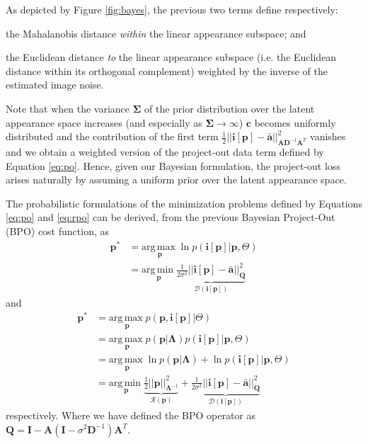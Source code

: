 As depicted by Figure \ref{fig:bayes}, the previous two terms define respectively: 
\begin{inparaenum}
    \item the Mahalanobis distance \emph{within} the linear appearance subspace; and 
    \item the Euclidean distance \emph{to} the linear appearance subspace (i.e. the Euclidean distance within its orthogonal complement) weighted by the inverse of the estimated image noise.
\end{inparaenum}
Note that when the variance $\mathbf{\Sigma}$ of the prior distribution over the latent appearance space increases (and especially as $\mathbf{\Sigma} \rightarrow \infty$) $\mathbf{c}$ becomes uniformly distributed and the contribution of the first term $\frac{1}{2}|| \mathbf{i}[\mathbf{p}] - \mathbf{\bar{a}} ||^2_{\mathbf{A}\mathbf{D}^{-1}\mathbf{A}^T}$ vanishes and we obtain a weighted version of the project-out data term defined by Equation \ref{eq:po}. Hence, given our Bayesian formulation, the project-out loss arises naturally by assuming a uniform prior over the latent appearance space.

The probabilistic formulations of the minimization problems defined by Equations \ref{eq:po} and \ref{eq:rpo} can be derived, from the previous Bayesian Project-Out (BPO) cost function, as
\begin{equation}
    \begin{aligned}
        \mathbf{p}^* & = \underset{\mathbf{p}}{\mathrm{arg\,max\;}} \ln p(\mathbf{i}[\mathbf{p}] | \mathbf{p}, \Theta)
        \\
        & = \underset{\mathbf{p}}{\mathrm{arg\,min\;}} \underbrace{\frac{1}{2\sigma^2}|| \mathbf{i}[\mathbf{p}] - \mathbf{\bar{a}} ||^2_{\mathbf{Q}}}_{\mathcal{D}(\mathbf{i}[\mathbf{p}])}
    \end{aligned}
    \label{eq:prob_rpo}
\end{equation}
and 
\begin{equation}
    \begin{aligned}
        \mathbf{p}^* & = \underset{\mathbf{p}}{\mathrm{arg\,max\;}} p(\mathbf{p}, \mathbf{i}[\mathbf{p}] | \Theta) 
        \\
        & = \underset{\mathbf{p}}{\mathrm{arg\,max\;}}  p(\mathbf{p} | \mathbf{\Lambda})  p(\mathbf{i}[\mathbf{p}] |
        \mathbf{p}, \Theta)  
        \\
        & = \underset{\mathbf{p}}{\mathrm{arg\,max\;}}  \ln p(\mathbf{p} | \mathbf{\Lambda}) + \ln p(\mathbf{i}[\mathbf{p}] | \mathbf{p}, \Theta)
        \\
        & = \underset{\mathbf{p}}{\mathrm{arg\,min\;}}  \underbrace{\frac{1}{2} ||\mathbf{p}||^2_{\mathbf{\Lambda}^{-1}}}_{\mathcal{R}(\mathbf{p})} + \underbrace{\frac{1}{2\sigma^2}|| \mathbf{i}[\mathbf{p}] - \mathbf{\bar{a}} ||^2_{\mathbf{Q}}}_{\mathcal{D}(\mathbf{i}[\mathbf{p}])}
    \end{aligned}
    \label{eq:prob_rpo}
\end{equation}
respectively. Where we have defined the BPO operator as $\mathbf{Q} = \mathbf{I} - \mathbf{A}(\mathbf{I} - \sigma^2\mathbf{D}^{-1})\mathbf{A}^T$.

